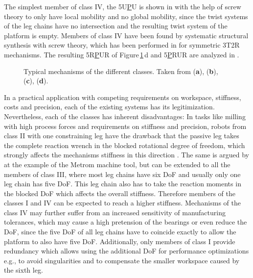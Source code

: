 \documentclass[robotics,article,accept,moreauthors,pdftex]{Definitions/mdpi}
\begin{document}
The simplest member of class IV, the 5U\underline{P}U is shown in \cite{HuangLi2002} with the help of screw theory to only have local mobility and no global mobility, since the twist systems of the leg chains have no intersection and the resulting twist system of the platform is empty.
Members of class IV have been found by systematic structural synthesis with screw theory, which has been performed in \cite{KongGos2005} for symmetric 3T2R mechanisms.
The resulting 5R\underline{P}UR of Figure\,\ref{fig:systems_pictures}\,d and 5\underline{P}RUR are analyzed in \cite{Tale-MasoulehGos2011,Tale-MasoulehSaaGosTag2010}.
%
\begin{figure}[h!]
	
	\caption{Typical mechanisms of the different classes. Taken from \cite{ZhangGos2001} (\textbf{a}), \cite{MbarekNefCor2005} (\textbf{b}), \cite{AlaghebandMahMilBen2015} (\textbf{c}), \cite{Tale-MasoulehGos2011} (\textbf{d}).}
	\label{fig:systems_pictures}
	\vspace{-0.4cm}	%
    \vspace{-0.5cm} %
\end{figure} 
\newpage
%
In a practical application with competing requirements on workspace, stiffness, costs and precision, each of the existing systems has its legitimization.
Nevertheless, each of the classes has inherent disadvantages:
In tasks like milling with high process forces and requirements on stiffness and precision, robots from class II with one constraining leg have the drawback that the passive leg takes the complete reaction wrench in the blocked rotational degree of freedom, which strongly affects the mechanisms stiffness in this direction \cite{ZhangGos2001}.
The same is argued by \cite{LinLiYanZha2013} at the example of the Metrom machine tool, but can be extended to all the members of class III, where most leg chains have six DoF and usually only one leg chain has five DoF.
This leg chain also has to take the reaction moments in the blocked DoF which affects the overall stiffness.
Therefore\added[id=Sp]{,} members of the classes I and IV can be expected to reach a higher stiffness.
Mechanisms of the class IV may further suffer from an increased sensitivity of manufacturing tolerances, which may cause a high pretension of the bearings or even reduce the DoF, since the five DoF of all leg chains have to coincide exactly to allow the platform to also have five DoF.
Additionally, only members of class I provide redundancy which allows using the additional DoF for performance optimizations\added[id=Sp]{,} e.g., to avoid singularities and to compensate the smaller workspace caused by the sixth leg.
\end{document}
